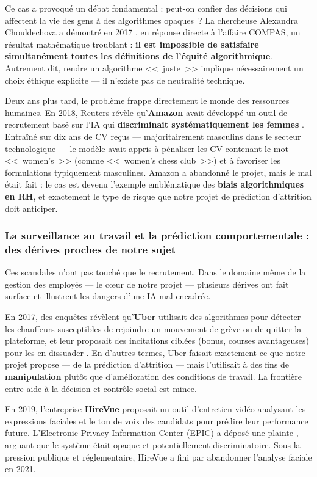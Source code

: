 \documentclass[12pt,a4paper]{article}
\begin{document}
Ce cas a provoqué un débat fondamental : peut-on confier des décisions qui affectent la vie des gens à des algorithmes opaques~? La chercheuse Alexandra Chouldechova a démontré en 2017 \cite{chouldechova_2017}, en réponse directe à l'affaire COMPAS, un résultat mathématique troublant : \textbf{il est impossible de satisfaire simultanément toutes les définitions de l'équité algorithmique}. Autrement dit, rendre un algorithme <<~juste~>> implique nécessairement un choix éthique explicite --- il n'existe pas de neutralité technique.

Deux ans plus tard, le problème frappe directement le monde des ressources humaines. En 2018, Reuters révèle qu'\textbf{Amazon} avait développé un outil de recrutement basé sur l'IA qui \textbf{discriminait systématiquement les femmes} \cite{amazon_reuters}. Entraîné sur dix ans de CV reçus --- majoritairement masculins dans le secteur technologique --- le modèle avait appris à pénaliser les CV contenant le mot <<~women's~>> (comme <<~women's chess club~>>) et à favoriser les formulations typiquement masculines. Amazon a abandonné le projet, mais le mal était fait : le cas est devenu l'exemple emblématique des \textbf{biais algorithmiques en RH}, et exactement le type de risque que notre projet de prédiction d'attrition doit anticiper.

\subsubsection{La surveillance au travail et la prédiction comportementale : des dérives proches de notre sujet}

Ces scandales n'ont pas touché que le recrutement. Dans le domaine même de la gestion des employés --- le cœur de notre projet --- plusieurs dérives ont fait surface et illustrent les dangers d'une IA mal encadrée.

En 2017, des enquêtes révèlent qu'\textbf{Uber} utilisait des algorithmes pour détecter les chauffeurs susceptibles de rejoindre un mouvement de grève ou de quitter la plateforme, et leur proposait des incitations ciblées (bonus, courses avantageuses) pour les en dissuader \cite{uber_algo}. En d'autres termes, Uber faisait exactement ce que notre projet propose --- de la prédiction d'attrition --- mais l'utilisait à des fins de \textbf{manipulation} plutôt que d'amélioration des conditions de travail. La frontière entre aide à la décision et contrôle social est mince.

En 2019, l'entreprise \textbf{HireVue} proposait un outil d'entretien vidéo analysant les expressions faciales et le ton de voix des candidats pour prédire leur performance future. L'Electronic Privacy Information Center (EPIC) a déposé une plainte \cite{hirevue_epic}, arguant que le système était opaque et potentiellement discriminatoire. Sous la pression publique et réglementaire, HireVue a fini par abandonner l'analyse faciale en 2021.
\end{document}
